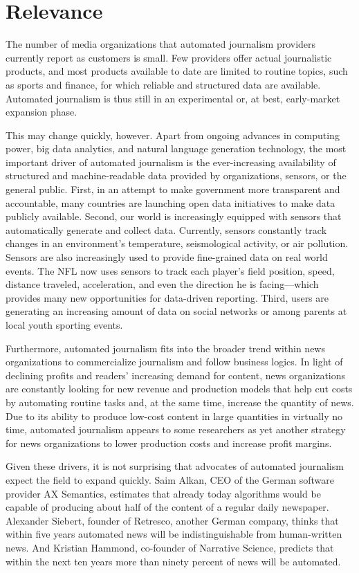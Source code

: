 \documentclass[notoc, symmetric, nobib, nols]{towcenter-guideto-book}
\begin{document}
\section{Relevance}

The number of media organizations that automated journalism providers currently report as customers is small. Few providers offer actual journalistic products, and most products available to date are limited to routine topics, such as sports and finance, for which reliable and structured data are available. Automated journalism is thus still in an experimental or, at best, early-market expansion phase.\autocite{doerr15}

This may change quickly, however. Apart from ongoing advances in computing power, big data analytics, and natural language generation technology, the most important driver of automated journalism is the ever-increasing availability of structured and machine-readable data provided by organizations, sensors, or the general public. First, in an attempt to make government more transparent and accountable, many countries are launching open data initiatives to make data publicly available. Second, our world is increasingly equipped with sensors that automatically generate and collect data. Currently, sensors constantly track changes in an environment's temperature, seismological activity, or air pollution. Sensors are also increasingly used to provide fine-grained data on real world events. The NFL now uses sensors to track each player's field position, speed, distance traveled, acceleration, and even the direction he is facing---which provides many new opportunities for data-driven reporting. Third, users are generating an increasing amount of data on social networks or among parents at local youth sporting events. 

Furthermore, automated journalism fits into the broader trend within news organizations to commercialize journalism and follow business logics. In light of declining profits and readers' increasing demand for content, news organizations are constantly looking for new revenue and production models that help cut costs by automating routine tasks and, at the same time, increase the quantity of news. Due to its ability to produce low-cost content in large quantities in virtually no time, automated journalism appears to some researchers as yet another strategy for news organizations to lower production costs and increase profit margins.\autocite{cohen15}

Given these drivers, it is not surprising that advocates of automated journalism expect the field to expand quickly. Saim Alkan, CEO of the German software provider AX Semantics, estimates that already today algorithms would be capable of producing about half of the content of a regular daily newspaper. Alexander Siebert, founder of Retresco, another German company, thinks that within five years automated news will be indistinguishable from human-written news.\autocite{sie14} And Kristian Hammond, co-founder of Narrative Science, predicts that within the next ten years more than ninety percent of news will be automated.\autocite{levy12} 
\end{document}
